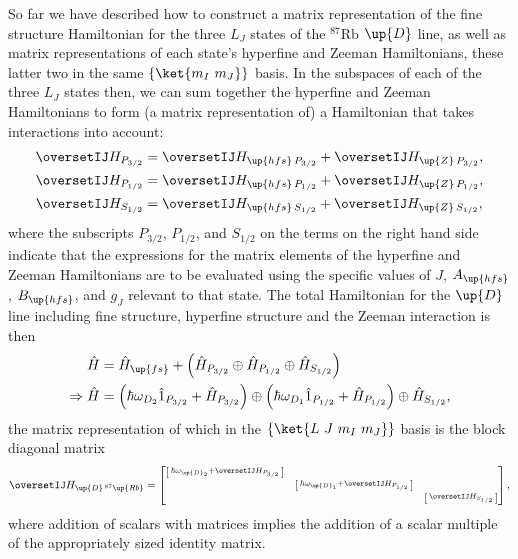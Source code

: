So far we have described how to construct a matrix representation of the fine structure Hamiltonian for the three $L_J$ states of the $^{87}$Rb $\up{D}$ line, as well as matrix representations of each state's hyperfine and Zeeman Hamiltonians, these latter two in the same $\{\ket{m_I\ m_J}\}$ basis. In the subspaces of each of the three $L_J$ states then, we can sum together the hyperfine and Zeeman Hamiltonians to form (a matrix representation of) a Hamiltonian that takes interactions into account:
\begin{align}
\oversetIJ H_{P_{3/2}} &=
  \oversetIJ H_{\up{hfs}\,P_{3/2}} + \oversetIJ H_{\up{Z}\,P_{3/2}},\\
\oversetIJ H_{P_{1/2}} &=
  \oversetIJ H_{\up{hfs}\,P_{1/2}} + \oversetIJ H_{\up{Z}\,P_{1/2}},\\
\oversetIJ H_{S_{1/2}} &=
  \oversetIJ H_{\up{hfs}\,S_{1/2}} + \oversetIJ H_{\up{Z}\,S_{1/2}},
\end{align}
where the subscripts $P_{3/2}$, $P_{1/2}$, and $S_{1/2}$ on the terms on the right hand side indicate that the expressions for the matrix elements of the hyperfine and Zeeman Hamiltonians are to be evaluated using the specific values of $J$, $A_\up{hfs}$, $B_\up{hfs}$, and $g_J$ relevant to that state. The total Hamiltonian for the $\up{D}$ line including fine structure, hyperfine structure and the Zeeman interaction is then
\begin{align}
\hat H &= \hat H_\up{fs} +
    \left(\hat H_{P_{3/2}} \oplus \hat H_{P_{1/2}} \oplus \hat H_{S_{1/2}} \right)\\
\Rightarrow \hat H &= 
\left(\hbar\omega_{D_2}\hat 1_{P_{3/2}} + \hat H_{P_{3/2}}\right) \oplus
\left(\hbar\omega_{D_1}\hat 1_{P_{1/2}} + \hat H_{P_{1/2}}\right) \oplus \hat H_{S_{1/2}},
\end{align}
the matrix representation of which in the $\{\ket{L\ J\ m_I\ m_J}\}$ basis is the block diagonal matrix
\begin{align}
\oversetIJ H_{\up{D}\,^{87}\up{Rb}}  = 
\left[\begin{matrix}
    \left[\begin{smallmatrix}
        \hbar\omega_{\up{D}_2} + \oversetIJ  H_{P_{3/2}}\\
    \end{smallmatrix} \right]\\
    & \left[\begin{smallmatrix}
        \hbar\omega_{\up{D}_1} + \oversetIJ  H_{P_{1/2}}\\
      \end{smallmatrix} \right]\\
    & &\left[\begin{smallmatrix}
        \oversetIJ  H_{S_{1/2}}\\
        \end{smallmatrix} \right]\\
\end{matrix} \right],
\end{align}
where addition of scalars with matrices implies the addition of a scalar multiple of the appropriately sized identity matrix.

